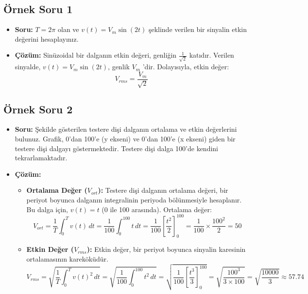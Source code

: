 \documentclass[11pt,letterpaper]{fenbil}
\begin{document}
\begin{spacing}{1.2}
\subsection*{Örnek Soru 1}
\begin{itemize}
\item \textbf{Soru:} $T = 2\pi$ olan ve $v(t) = V_m \sin(2t)$ şeklinde verilen bir sinyalin etkin değerini hesaplayınız.
\item \textbf{Çözüm:}
    Sinüzoidal bir dalganın etkin değeri, genliğin $\frac{1}{\sqrt{2}}$ katıdır. Verilen sinyalde, $v(t) = V_m \sin(2t)$, genlik $V_m$ 'dir. Dolayısıyla, etkin değer:
    \[
    V_{rms} = \frac{V_m}{\sqrt{2}}
    \]
\end{itemize}

\subsection*{Örnek Soru 2}
\begin{itemize}
\item \textbf{Soru:} Şekilde gösterilen testere dişi dalganın ortalama ve etkin değerlerini bulunuz. Grafik, 0'dan 100'e (y ekseni) ve 0'dan 100'e (x ekseni) giden bir testere dişi dalgayı göstermektedir. Testere dişi dalga 100'de kendini tekrarlamaktadır.
\item \textbf{Çözüm:}
    \begin{itemize}
    \item \textbf{Ortalama Değer ($V_{ort}$):} Testere dişi dalganın ortalama değeri, bir periyot boyunca dalganın integralinin periyoda bölünmesiyle hesaplanır. Bu dalga için, $v(t) = t$ (0 ile 100 arasında). Ortalama değer:
    \[
    V_{ort} = \frac{1}{T} \int_{0}^{T} v(t) \, dt = \frac{1}{100} \int_{0}^{100} t \, dt = \frac{1}{100} \left[ \frac{t^2}{2} \right]_0^{100} = \frac{1}{100} \times \frac{100^2}{2} = 50
    \]
    \item \textbf{Etkin Değer ($V_{rms}$):} Etkin değer, bir periyot boyunca sinyalin karesinin ortalamasının kareköküdür.
    \[
    V_{rms} = \sqrt{\frac{1}{T} \int_{0}^{T} v(t)^2 \, dt} = \sqrt{\frac{1}{100} \int_{0}^{100} t^2 \, dt} = \sqrt{\frac{1}{100} \left[ \frac{t^3}{3} \right]_0^{100}} = \sqrt{\frac{100^3}{3 \times 100}} = \sqrt{\frac{10000}{3}} \approx 57.74
    \]
    \end{itemize}
\end{itemize}

\end{spacing}
\end{document}

